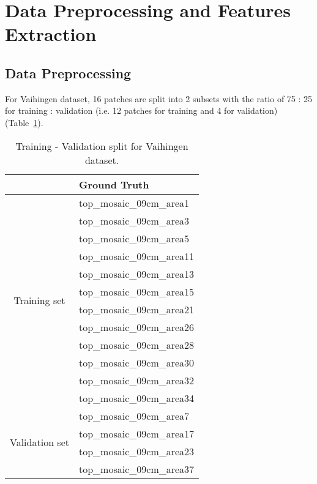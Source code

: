 \section{Data Preprocessing and Features Extraction}
\subsection{Data Preprocessing}
For Vaihingen dataset, 16 patches are split into 2 subsets with the ratio of 75
: 25 for training : validation (i.e. 12 patches for training and 4 for
validation) (Table~\ref{tab:vaihingen_train_val}).
\begin{table}[h]
    \centering
    \begin{tabular}{ c | l }
        & Ground Truth \\
        \hline
        \multirow{12}{*}{Training set} & top\_mosaic\_09cm\_area1 \\
        & top\_mosaic\_09cm\_area3 \\
        & top\_mosaic\_09cm\_area5 \\
        & top\_mosaic\_09cm\_area11 \\
        & top\_mosaic\_09cm\_area13 \\
        & top\_mosaic\_09cm\_area15 \\
        & top\_mosaic\_09cm\_area21 \\
        & top\_mosaic\_09cm\_area26 \\
        & top\_mosaic\_09cm\_area28 \\
        & top\_mosaic\_09cm\_area30 \\
        & top\_mosaic\_09cm\_area32 \\
        & top\_mosaic\_09cm\_area34 \\
        \hline
        \multirow{4}{*}{Validation set} & top\_mosaic\_09cm\_area7 \\
        & top\_mosaic\_09cm\_area17 \\
        & top\_mosaic\_09cm\_area23 \\
        & top\_mosaic\_09cm\_area37
    \end{tabular}
    \caption{Training - Validation split for Vaihingen dataset.}
    \label{tab:vaihingen_train_val}
\end{table}


